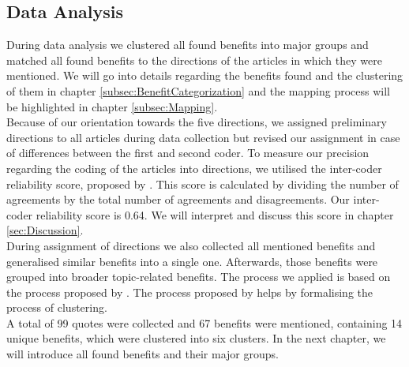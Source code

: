 \subsection{Data Analysis}
\label{subsec:DataAnalysis}
During data analysis we clustered all found benefits into major groups and matched all found benefits to the directions of the articles in which they were mentioned. We will go into details regarding the benefits found and the clustering of them in chapter \ref{subsec:BenefitCategorization} and the mapping process will be highlighted in chapter \ref{subsec:Mapping}.\\
Because of our orientation towards the five directions, we assigned preliminary directions to all articles during data collection but revised our assignment in case of differences between the first and second coder. To measure our precision regarding the coding of the articles into directions, we utilised the inter-coder reliability score, proposed by \cite{Miles.1994}.\autocite[cf.][46]{Miles.1994} This score is calculated by dividing the number of agreements by the total number of agreements and disagreements. Our inter-coder reliability score is 0.64. We will interpret and discuss this score in chapter \ref{sec:Discussion}. \\
During assignment of directions we also collected all mentioned benefits and generalised similar benefits into a single one. Afterwards, those benefits were grouped into broader topic-related benefits. The process we applied is based on the process proposed by \cite{Jankowicz.2004}.\autocite[cf.][149]{Jankowicz.2004} The process proposed by \cite{Jankowicz.2004} helps by formalising the process of clustering.\\
A total of 99 quotes were collected and 67 benefits were mentioned, containing 14 unique benefits, which were clustered into six clusters. In the next chapter, we will introduce all found benefits and their major groups.